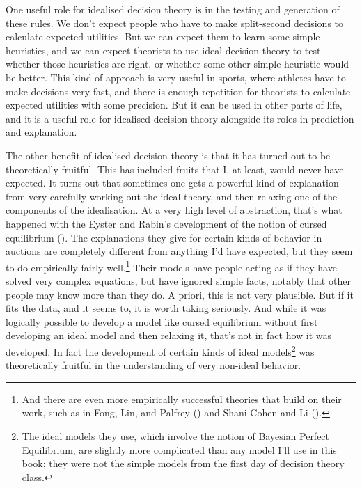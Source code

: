 \documentclass[
  12pt,
  letterpaper,
  DIV=11,
  numbers=noendperiod]{scrreprt}
\begin{document}
One useful role for idealised decision theory is in the testing and
generation of these rules. We don't expect people who have to make
split-second decisions to calculate expected utilities. But we can
expect them to learn some simple heuristics, and we can expect theorists
to use ideal decision theory to test whether those heuristics are right,
or whether some other simple heuristic would be better. This kind of
approach is very useful in sports, where athletes have to make decisions
very fast, and there is enough repetition for theorists to calculate
expected utilities with some precision. But it can be used in other
parts of life, and it is a useful role for idealised decision theory
alongside its roles in prediction and explanation.

The other benefit of idealised decision theory is that it has turned out
to be theoretically fruitful. This has included fruits that I, at least,
would never have expected. It turns out that sometimes one gets a
powerful kind of explanation from very carefully working out the ideal
theory, and then relaxing one of the components of the idealisation. At
a very high level of abstraction, that's what happened with the Eyster
and Rabin's development of the notion of cursed equilibrium
(). The
explanations they give for certain kinds of behavior in auctions are
completely different from anything I'd have expected, but they seem to
do empirically fairly well.\footnote{And there are even more empirically
  successful theories that build on their work, such as in Fong, Lin,
  and Palfrey () and Shani Cohen and
  Li ().} Their models have
people acting as if they have solved very complex equations, but have
ignored simple facts, notably that other people may know more than they
do. A priori, this is not very plausible. But if it fits the data, and
it seems to, it is worth taking seriously. And while it was logically
possible to develop a model like cursed equilibrium without first
developing an ideal model and then relaxing it, that's not in fact how
it was developed. In fact the development of certain kinds of ideal
models\footnote{The ideal models they use, which involve the notion of
  Bayesian Perfect Equilibrium, are slightly more complicated than any
  model I'll use in this book; they were not the simple models from the
  first day of decision theory class.} was theoretically fruitful in the
understanding of very non-ideal behavior.
\end{document}
